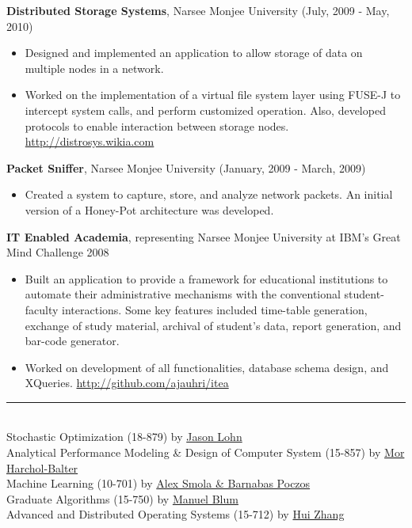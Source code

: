 \documentclass[a4paper,oneside,english]{article}
\begin{document}
\noindent\textbf{Distributed Storage Systems}, Narsee Monjee University (July, 2009 - May, 2010)
\begin{itemize}
	\itemsep0em
	\item Designed and implemented an application to allow storage of data on multiple nodes in a network. 
	\item Worked on the implementation of a virtual file system layer using FUSE-J to intercept system calls, and perform customized operation. Also, developed protocols to enable interaction between storage nodes. \url{http://distrosys.wikia.com}
\end{itemize} \vspace*{2mm}
\noindent\textbf{Packet Sniffer}, Narsee Monjee University (January, 2009 - March, 2009)
\begin{itemize}
	\itemsep0em
	\item Created a system to capture, store, and analyze network packets. An initial version of a Honey-Pot architecture was developed.
\end{itemize} \vspace*{2mm}
\noindent\textbf{IT Enabled Academia}, representing Narsee Monjee University at IBM's Great Mind Challenge 2008
\begin{itemize}
	\itemsep0em
	\item Built an application to provide a framework for educational institutions to automate their administrative mechanisms with the conventional student-faculty interactions. Some key features included time-table generation, exchange of study material, archival of student’s data, report generation, and bar-code generator.
	\item Worked on development of all functionalities, database schema design, and XQueries. \url{http://github.com/ajauhri/itea}
\end{itemize}
\noindent\rule{6in}{0.4pt} \\[4pt]
Stochastic Optimization (18-879) by \href{https://www.cmu.edu/silicon-valley/faculty-staff/lohn-jason.html}{\UrlFont Jason Lohn} \vspace*{2mm} \\  
Analytical Performance Modeling \& Design of Computer System (15-857) by \href{https://www.cs.cmu.edu/~harchol/Perfclass/class12fall.html}{\UrlFont Mor Harchol-Balter}\vspace*{2mm} \\
Machine Learning (10-701) by \href{http://alex.smola.org/teaching/cmu2013-10-701/}{\UrlFont Alex Smola \& Barnabas Poczos}  \vspace*{2mm} \\
Graduate Algorithms (15-750) by \href{https://www.cs.cmu.edu/~mblum/}{\UrlFont Manuel Blum}  \vspace*{2mm} \\
Advanced and Distributed Operating Systems (15-712) by \href{https://www.cs.cmu.edu/~15712/}{\UrlFont Hui Zhang}
\end{document}
